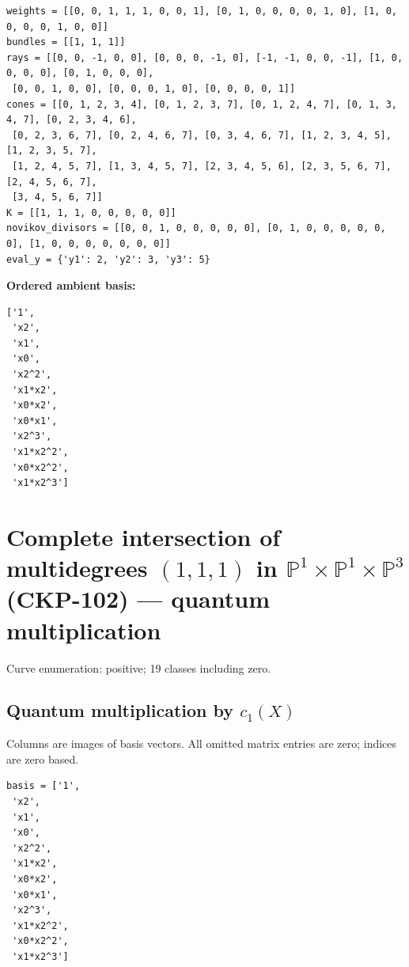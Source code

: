 \documentclass[10pt,a4paper]{article}
\begin{document}
\begin{lstlisting}
weights = [[0, 0, 1, 1, 1, 0, 0, 1], [0, 1, 0, 0, 0, 0, 1, 0], [1, 0, 0, 0, 0, 1, 0, 0]]
bundles = [[1, 1, 1]]
rays = [[0, 0, -1, 0, 0], [0, 0, 0, -1, 0], [-1, -1, 0, 0, -1], [1, 0, 0, 0, 0], [0, 1, 0, 0, 0],
 [0, 0, 1, 0, 0], [0, 0, 0, 1, 0], [0, 0, 0, 0, 1]]
cones = [[0, 1, 2, 3, 4], [0, 1, 2, 3, 7], [0, 1, 2, 4, 7], [0, 1, 3, 4, 7], [0, 2, 3, 4, 6],
 [0, 2, 3, 6, 7], [0, 2, 4, 6, 7], [0, 3, 4, 6, 7], [1, 2, 3, 4, 5], [1, 2, 3, 5, 7],
 [1, 2, 4, 5, 7], [1, 3, 4, 5, 7], [2, 3, 4, 5, 6], [2, 3, 5, 6, 7], [2, 4, 5, 6, 7],
 [3, 4, 5, 6, 7]]
K = [[1, 1, 1, 0, 0, 0, 0, 0]]
novikov_divisors = [[0, 0, 1, 0, 0, 0, 0, 0], [0, 1, 0, 0, 0, 0, 0, 0], [1, 0, 0, 0, 0, 0, 0, 0]]
eval_y = {'y1': 2, 'y2': 3, 'y3': 5}
\end{lstlisting}

\textbf{Ordered ambient basis:}
\begin{lstlisting}
['1',
 'x2',
 'x1',
 'x0',
 'x2^2',
 'x1*x2',
 'x0*x2',
 'x0*x1',
 'x2^3',
 'x1*x2^2',
 'x0*x2^2',
 'x1*x2^3']
\end{lstlisting}

\clearpage\section*{Complete intersection of multidegrees $(1,1,1)$ in $\mathbb P^{1}\times \mathbb P^{1}\times \mathbb P^{3}$ (CKP-102) --- quantum multiplication}

Curve enumeration: positive; 19 classes including zero.
\subsection*{Quantum multiplication by $c_1(X)$}
Columns are images of basis vectors. All omitted matrix entries are zero; indices are zero based.

\begin{lstlisting}
basis = ['1',
 'x2',
 'x1',
 'x0',
 'x2^2',
 'x1*x2',
 'x0*x2',
 'x0*x1',
 'x2^3',
 'x1*x2^2',
 'x0*x2^2',
 'x1*x2^3']
\end{lstlisting}
\end{document}
